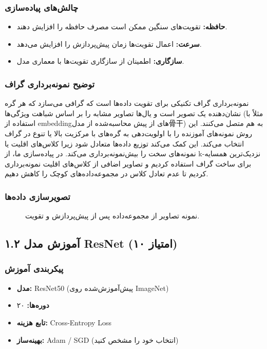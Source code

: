 \documentclass[12pt,a4paper]{article}
\theoremstyle{definition}
\begin{document}
\subsubsection*{چالش‌های پیاده‌سازی}
\begin{itemize}
    \item \textbf{حافظه:} تقویت‌های سنگین ممکن است مصرف حافظه را افزایش دهند.
    \item \textbf{سرعت:} اعمال تقویت‌ها زمان پیش‌پردازش را افزایش می‌دهد.
    \item \textbf{سازگاری:} اطمینان از سازگاری تقویت‌ها با معماری مدل.
\end{itemize}

\subsubsection*{توضیح نمونه‌برداری گراف}
نمونه‌برداری گراف تکنیکی برای تقویت داده‌ها است که گرافی می‌سازد که هر گره نشان‌دهنده یک تصویر است و یال‌ها تصاویر مشابه را بر اساس شباهت ویژگی‌ها (مثلاً با استفاده از embeddingهای از پیش محاسبه‌شده از مدل骨干) به هم متصل می‌کنند. این روش نمونه‌های آموزنده را با اولویت‌دهی به گره‌های با مرکزیت بالا یا تنوع در گراف انتخاب می‌کند. این کمک می‌کند توزیع داده‌ها متعادل شود زیرا کلاس‌های اقلیت یا نمونه‌های سخت را بیش‌نمونه‌برداری می‌کند. در پیاده‌سازی ما، از k-نزدیک‌ترین همسایه برای ساخت گراف استفاده کردیم و تصاویر اضافی از کلاس‌های اقلیت نمونه‌برداری کردیم تا عدم تعادل کلاس در مجموعه‌داده‌های کوچک را کاهش دهیم.

\subsubsection*{تصویرسازی داده‌ها}
\begin{figure}[H]
    \centering
    \caption{نمونه تصاویر از مجموعه‌داده پس از پیش‌پردازش و تقویت.}
    \label{fig:samples}
\end{figure}


\subsection{۱.۲ آموزش مدل ResNet (۱۰ امتیاز)}

\subsubsection*{پیکربندی آموزش}
\begin{itemize}
    \item \textbf{مدل:} ResNet50 (پیش‌آموزش‌شده روی ImageNet)
    \item \textbf{دوره‌ها:} ۲۰
    \item \textbf{تابع هزینه:} Cross-Entropy Loss
    \item \textbf{بهینه‌ساز:} Adam / SGD (انتخاب خود را مشخص کنید)
\end{itemize}
\end{document}
